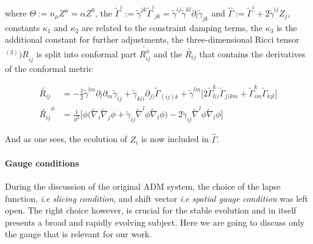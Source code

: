 where $\Theta:=n_{\mu}Z^{\mu}=\alpha Z^0$, the $\widetilde{\Gamma}^i:=\widetilde{\gamma}^{jk}{\widetilde{\Gamma}^i}_{jk} = \widetilde{\gamma}^{ij}\widetilde{\gamma}^{kl}\partial_{l}\widetilde{\gamma}_{jk}$ and $\hat{\Gamma}:=\widetilde{\Gamma}^i + 2\widetilde{\gamma}^{ij}Z_j$, constants $\kappa_1$ and $\kappa_2$ are related to the constraint damping terms, the $\kappa_3$ is the additional constant for further adjustments, the three-dimensional Ricci tensor ${^{(3)})R}_{ij}$ is split into conformal part $\widetilde{R_{ij}^{\phi}}$ and the $\widetilde{R_{ij}}$ that contains the derivatives of the conformal metric

\begin{align}
\widetilde{R_{ij}} &= -\frac{1}{2}\widetilde{\gamma}^{lm}\partial_{l}\partial_{m}\widetilde{\gamma}_{ij} + \widetilde{\gamma}_{k(i}\partial_{j)}\widetilde{\Gamma}_{(ij)k} + \widetilde{\gamma}^{lm}\big[2\widetilde{\Gamma}^{k}_{l(i}\widetilde{\Gamma}_{j)km} + \widetilde{\Gamma}^{k}_{im}\widetilde{\Gamma}_{kjl}\big] \\
\widetilde{R_{ij}}^{\phi} &= \frac{1}{\phi^2}\big[\phi\big(\widetilde{\nabla}_{i}\widetilde{\nabla}_{j}\phi + \widetilde{\gamma}_{ij}\widetilde{\nabla}^{l}\phi\widetilde{\nabla}_{l}\phi\big) - 2\widetilde{\gamma}_{ij}\widetilde{\nabla}^{l}\phi\widetilde{\nabla}_{l}\phi\big]
\end{align}

And as one sees, the ecolution of $Z_i$ is now included in $\hat{\Gamma}$. 


\paragraph{Gauge conditions}


During the discussion of the original ADM system, the choice of the lapse function, \textit{i.e} \textit{slicing condition}, and shift vector \textit{i.e} \textit{spatial gauge condition} was left open. 
The right choice however, is crucial for the stable evolution and in itself presents a broad and rapidly evolving subject. Here we are going to discuss only the gauge that is relevant for our work. 

